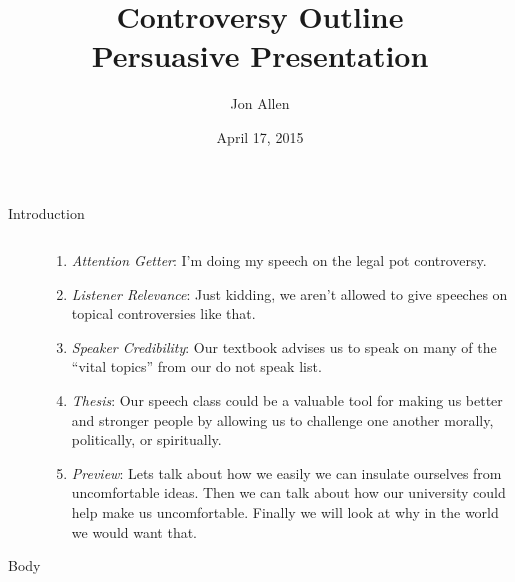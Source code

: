 \documentclass[letterpaper]{article}
\begin{document}
\title{Controversy Outline\\Persuasive Presentation}
\date{April 17, 2015}
\author{Jon Allen}
\maketitle
\renewcommand{\labelenumi}{\Roman{enumi}}
\renewcommand{\labelenumii}{\Alph{enumii}.}

\begin{description}
\item[Introduction]$\quad$

  \begin{enumerate}
  \item
  \emph{Attention Getter}:
  I'm doing my speech on the legal pot controversy.
  \item
  \emph{Listener Relevance}:
  Just kidding, we aren't allowed to give speeches on topical controversies like that.
  \item
  \emph{Speaker Credibility}:
  Our textbook \cite{text} advises us to speak on many of the ``vital topics'' from our do not speak list.
  \item
  \emph{Thesis}:
  Our speech class could be a valuable tool for making us better and stronger people by allowing us to challenge one another morally, politically, or spiritually.
  \item
  \emph{Preview}:
  Lets talk about how we easily we can insulate ourselves from uncomfortable ideas. Then we can talk about how our university could help make us uncomfortable. Finally we will look at why in the world we would want that.
  \end{enumerate}
\item[Body]$\quad$


\end{description}
\end{document}
